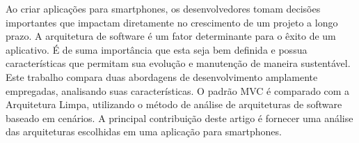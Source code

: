 Ao criar aplicações para smartphones, os desenvolvedores tomam decisões importantes que impactam diretamente no crescimento de um projeto a longo prazo.
A arquitetura de software é um fator determinante para o êxito de um aplicativo.
É de suma importância que esta seja bem definida e possua características que permitam sua evolução e manutenção de maneira sustentável.
Este trabalho compara duas abordagens de desenvolvimento amplamente empregadas, analisando suas características.
O padrão MVC é comparado com a Arquitetura Limpa, utilizando o método de análise de arquiteturas de software baseado em cenários.
A principal contribuição deste artigo é fornecer uma análise das arquiteturas escolhidas em uma aplicação para smartphones.